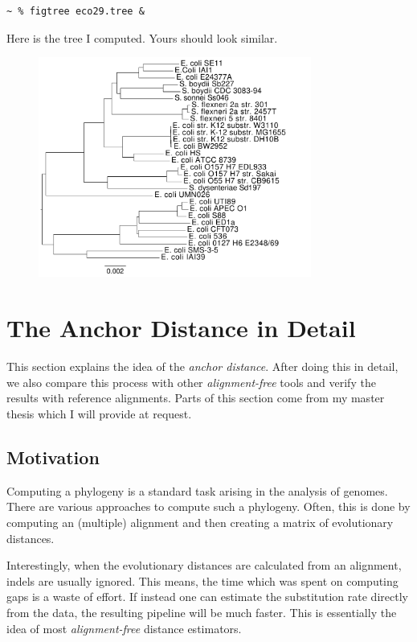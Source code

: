 \documentclass[a4paper,
  10pt,
  english,
  DIV=12,
  BCOR=8mm]{scrbook}
\begin{document}
\begin{lstlisting}
~ % figtree eco29.tree &
\end{lstlisting}

\noindent Here is the tree I computed. Yours should look similar.

\begin{figure}[h]
  \centering\includegraphics[width=0.8\textwidth]{img/eco29/andi_labels.pdf}
\end{figure}


\chapter{The Anchor Distance in Detail}

This section explains the idea of the \emph{anchor distance}. After doing this in detail, we also compare this process with other \emph{alignment-free} tools and verify the results with reference alignments. Parts of this section come from my master thesis which I will provide at request.

\section{Motivation}

Computing a phylogeny is a standard task arising in the analysis of genomes. There are various approaches to compute such a phylogeny. Often, this is done by computing an (multiple) alignment and then creating a matrix of evolutionary distances.


\noindent Interestingly, when the evolutionary distances are calculated from an alignment, indels are usually ignored. This means, the time which was spent on computing gaps is a waste of effort. If instead one can estimate the substitution rate directly from the data, the resulting pipeline will be much faster. This is essentially the idea of most \emph{alignment-free} distance estimators.
\end{document}

